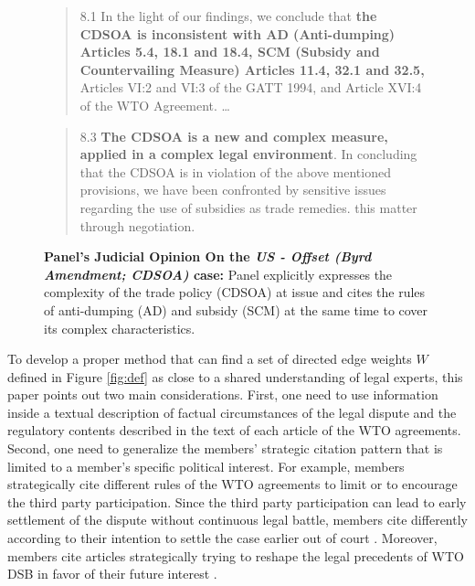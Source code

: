  
\begin{figure}[h]
   \begin{quote}
       8.1 In the light of our findings, we conclude that \textbf{the CDSOA is inconsistent with AD (Anti-dumping)
       Articles 5.4, 18.1 and 18.4, SCM (Subsidy and Countervailing Measure) Articles 11.4, 32.1 and 32.5,} Articles VI:2 and VI:3 of the GATT
       1994, and Article XVI:4 of the WTO Agreement. \ldots
   \end{quote}
   \begin{quote}
       8.3 \textbf{The CDSOA is a new and complex measure, applied in a complex legal environment}. In
       concluding that the CDSOA is in violation of the above mentioned provisions, we have been
       confronted by sensitive issues regarding the use of subsidies as trade remedies.
       this matter through negotiation.
   \end{quote}
   \caption{\textbf{Panel's Judicial Opinion On the \textit{US - Offset (Byrd Amendment; CDSOA)} case:} Panel explicitly expresses the complexity of the trade policy (CDSOA) at issue and cites the rules of anti-dumping (AD) and subsidy (SCM) at the same time to cover its complex characteristics.}
   \label{fig:complex-measure}
\end{figure}
 
To develop a proper method that can find a set of directed edge weights $W$ defined in Figure \ref{fig:def}
as close to a shared understanding of legal experts, this paper points out two main considerations.
First, one need to use information inside a textual description of factual circumstances of the legal dispute and the regulatory contents described in the text of each article of the WTO agreements.
Second, one need to generalize the members' strategic citation pattern that is limited to a member's specific political interest.
For example, members strategically cite different rules of the WTO agreements to limit or to encourage
the third party participation. Since the third party participation
can lead to early settlement of the dispute without continuous
legal battle, members cite differently according to their intention to
settle the case earlier out of court \citep{who_gets}. Moreover, members cite articles strategically trying to reshape the legal precedents of WTO DSB
in favor of their future interest \citep{pelc, latent}.
 
